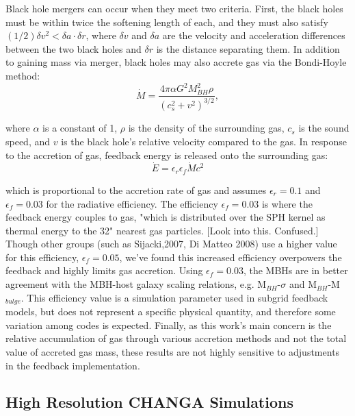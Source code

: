 \documentclass[manuscript]{aastex}
\begin{document}
	Black hole mergers can occur when they meet two criteria. First, the black holes must be within twice the softening length of each, and they must also satisfy $(1/2) \delta v^2 < \delta a \cdot \delta r$,  where $\delta v$ and $\delta a$ are the velocity and acceleration differences between the two black holes and $\delta r$ is the distance separating them. In addition to gaining mass via merger, black holes may also accrete gas via the Bondi-Hoyle method:
\begin{equation}
\dot{M} = \frac{4 \pi \alpha G^2 M^{2}_{BH} \rho}{(c^{2}_{s} + v^2)^{3/2}},
\end{equation}

where $\alpha$ is a constant of 1, $\rho$ is the density of the surrounding gas, $c_s$ is the sound speed, and $v$ is the black hole's relative velocity compared to the gas. In response to the accretion of gas, feedback energy is released onto the surrounding gas:
\begin{equation}
\dot{E} = \epsilon _{r} \epsilon _{f} \dot{M} c^2 
\end{equation}

which is proportional to the accretion rate of gas and assumes $\epsilon _r = 0.1$ and $\epsilon _f = 0.03$ for the radiative efficiency. The efficiency $\epsilon _f = 0.03$ is where the feedback energy couples to gas, "which is distributed over the SPH kernel as thermal energy to the 32" nearest gas particles. [Look into this. Confused.] Though other groups (such as Sijacki,2007, Di Matteo 2008) use a higher value for this efficiency, $\epsilon _f = 0.05$, we've found this increased efficiency overpowers the feedback and highly limits gas accretion. Using $\epsilon _f = 0.03$, the MBHs are in better agreement with the MBH-host galaxy scaling relations, e.g. M$_{BH}$-$\sigma$ and M$_{BH}$-M$_{bulge}$. This efficiency value is a simulation parameter used in subgrid feedback models, but does not represent a specific physical quantity, and therefore some variation among codes is expected. Finally, as this work's main concern is the relative accumulation of gas through various accretion methods and not the total value of accreted gas mass, these results are not highly sensitive to adjustments in the feedback implementation.

\subsection{High Resolution CHANGA Simulations}
\end{document}
